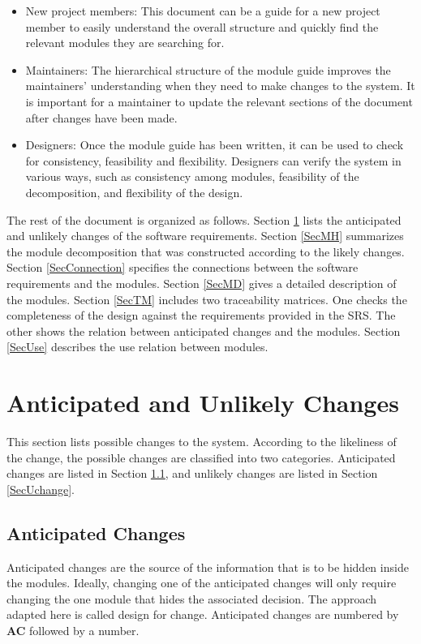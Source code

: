 \documentclass[12pt]{article}
\begin{document}
\begin{itemize}
\item New project members: This document can be a guide for a new project member
  to easily understand the overall structure and quickly find the
  relevant modules they are searching for.
\item Maintainers: The hierarchical structure of the module guide improves the
  maintainers' understanding when they need to make changes to the system. It is
  important for a maintainer to update the relevant sections of the document
  after changes have been made.
\item Designers: Once the module guide has been written, it can be used to
  check for consistency, feasibility and flexibility. Designers can verify the
  system in various ways, such as consistency among modules, feasibility of the
  decomposition, and flexibility of the design.
\end{itemize}

The rest of the document is organized as follows. Section
\ref{SecChange} lists the anticipated and unlikely changes of the software
requirements. Section \ref{SecMH} summarizes the module decomposition that
was constructed according to the likely changes. Section \ref{SecConnection}
specifies the connections between the software requirements and the
modules. Section \ref{SecMD} gives a detailed description of the
modules. Section \ref{SecTM} includes two traceability matrices. One checks
the completeness of the design against the requirements provided in the SRS. The
other shows the relation between anticipated changes and the modules. Section
\ref{SecUse} describes the use relation between modules.

\section{Anticipated and Unlikely Changes} \label{SecChange}

This section lists possible changes to the system. According to the likeliness
of the change, the possible changes are classified into two
categories. Anticipated changes are listed in Section \ref{SecAchange}, and
unlikely changes are listed in Section \ref{SecUchange}.

\subsection{Anticipated Changes} \label{SecAchange}

Anticipated changes are the source of the information that is to be hidden
inside the modules. Ideally, changing one of the anticipated changes will only
require changing the one module that hides the associated decision. The approach
adapted here is called design for
change. Anticipated changes are numbered by \textbf{AC} followed by a number.
\end{document}
